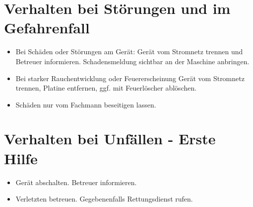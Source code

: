 \documentclass[fontsize=11pt]{scrartcl}
\begin{document}
\section{Verhalten bei Störungen und im Gefahrenfall}

\begin{itemize}
	\item Bei Schäden oder Störungen am Gerät: Gerät vom Stromnetz trennen und Betreuer informieren. Schadensmeldung sichtbar an der Maschine anbringen.
	\item Bei starker Rauchentwicklung oder Feuererscheinung Gerät vom Stromnetz trennen, Platine entfernen, ggf. mit Feuerlöscher ablöschen.
	\item Schäden nur vom Fachmann beseitigen lassen.
\end{itemize}

\section{Verhalten bei Unfällen - Erste Hilfe}

\begin{itemize}
	\item Gerät abschalten. Betreuer informieren. 
	\item Verletzten betreuen. Gegebenenfalls Rettungsdienst rufen.
\end{itemize}
\end{document}
